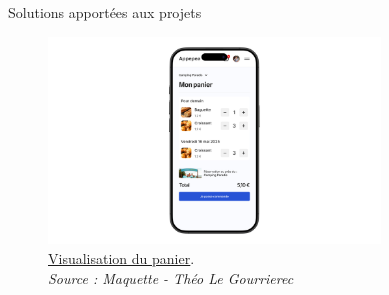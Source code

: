 \documentclass{beamer}
\begin{document}
\begin{frame}{Solutions apportées aux projets}
\begin{center}
		 {
			\addtocounter{figure}{3}
			\begin{figure}[t]
  				\includegraphics[height=5.5cm]{../img/maquette/panier.png}
				\caption{
					\centering
  					\href{https://github.com/Matteo-K/Soutenance_E-delic/blob/main/img/maquette/panier.png}{\underline{Visualisation du panier}}.\\
  					\textit{Source : Maquette - Théo Le Gourrierec}
				}
  				\label{fig:panier}
  			\end{figure}
		}
	\end{center}
	\vfill
\end{frame}
\end{document}

